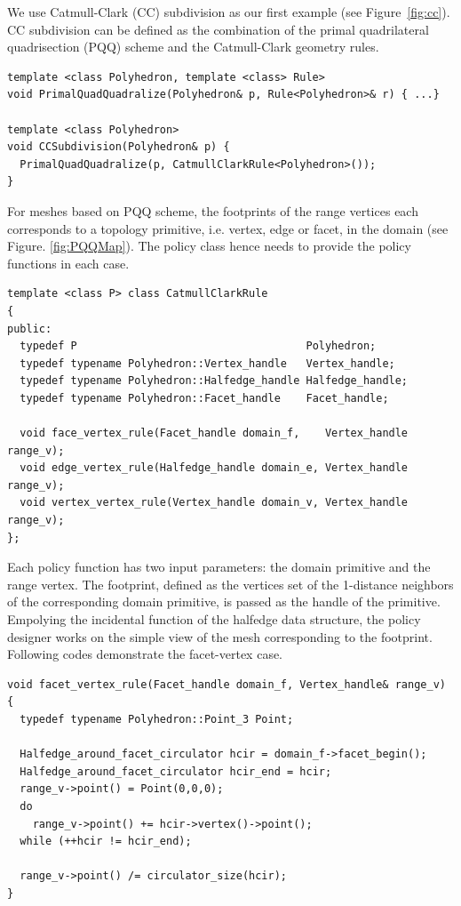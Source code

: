 
We use Catmull-Clark (CC) subdivision as our first example (see
Figure~\ref{fig:cc}). CC subdivision can be defined as the combination
of the primal quadrilateral quadrisection (PQQ) scheme and the
Catmull-Clark geometry rules.

{\scriptsize
\begin{verbatim}
template <class Polyhedron, template <class> Rule>
void PrimalQuadQuadralize(Polyhedron& p, Rule<Polyhedron>& r) { ...}

template <class Polyhedron>
void CCSubdivision(Polyhedron& p) { 
  PrimalQuadQuadralize(p, CatmullClarkRule<Polyhedron>());
}
\end{verbatim}
}

For meshes based on PQQ scheme, the footprints of the range vertices
each corresponds to a topology primitive, i.e. vertex, edge or facet,
in the domain (see Figure. \ref{fig:PQQMap}).  The policy class hence
needs to provide the policy functions in each case.

{ \scriptsize
\begin{verbatim}
template <class P> class CatmullClarkRule 
{
public:
  typedef P                                    Polyhedron;
  typedef typename Polyhedron::Vertex_handle   Vertex_handle;
  typedef typename Polyhedron::Halfedge_handle Halfedge_handle;
  typedef typename Polyhedron::Facet_handle    Facet_handle;

  void face_vertex_rule(Facet_handle domain_f,    Vertex_handle range_v);
  void edge_vertex_rule(Halfedge_handle domain_e, Vertex_handle range_v);
  void vertex_vertex_rule(Vertex_handle domain_v, Vertex_handle range_v);
};
\end{verbatim}
}

Each policy function has two input parameters: the domain primitive
and the range vertex. The footprint, defined as the vertices set of
the 1-distance neighbors of the corresponding domain primitive, is
passed as the handle of the primitive. Empolying the incidental
function of the halfedge data structure, the policy designer works on
the simple view of the  mesh corresponding to the
footprint. Following codes demonstrate the facet-vertex case.

{\scriptsize
\begin{verbatim}
void facet_vertex_rule(Facet_handle domain_f, Vertex_handle& range_v) 
{
  typedef typename Polyhedron::Point_3 Point;

  Halfedge_around_facet_circulator hcir = domain_f->facet_begin();
  Halfedge_around_facet_circulator hcir_end = hcir;
  range_v->point() = Point(0,0,0);
  do 
    range_v->point() += hcir->vertex()->point();
  while (++hcir != hcir_end);

  range_v->point() /= circulator_size(hcir);
}
\end{verbatim}
}

